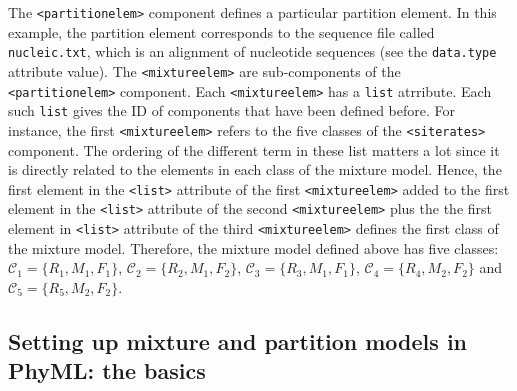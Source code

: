 \documentclass[a4paper,12pt]{article}
\newcommand{\x}[1]{\texttt{#1}}
\begin{document}
The  \x{<partitionelem>} component  defines a  particular partition  element. In  this example,  the
partition element corresponds to the sequence file  called \x{nucleic.txt}, which is an alignment of
nucleotide  sequences   (see  the   \x{data.type}  attribute   value).   The   \x{<mixtureelem>}  are
sub-components  of  the  \x{<partitionelem>}  component.   Each  \x{<mixtureelem>}  has  a  \x{list}
atrribute.   Each such  \x{list} gives  the ID  of components  that have  been defined  before.  For
instance,  the  first   \x{<mixtureelem>}  refers  to  the  five  classes   of  the  \x{<siterates>}
component. The  ordering of  the different term  in these list  matters a  lot since it  is directly
related  to the  elements in  each class  of  the mixture  model. Hence,  the first  element in  the
\x{<list>} attribute  of the first  \x{<mixtureelem>} added to the  first element in  the \x{<list>}
attribute of the second \x{<mixtureelem>} plus the  the first element in \x{<list>} attribute of the
third \x{<mixtureelem>} defines the  first class of the mixture model.  Therefore, the mixture model
defined   above   has   five   classes:  $\mathcal{C}_1   =   \{R_1,M_1,F_1\}$,   $\mathcal{C}_2   =
\{R_2,M_1,F_2\}$,  $\mathcal{C}_3   =  \{R_3,M_1,F_1\}$,   $\mathcal{C}_4  =   \{R_4,M_2,F_2\}$  and
$\mathcal{C}_5 = \{R_5,M_2,F_2\}$.




\subsection{Setting up mixture and partition models in PhyML: the basics}
\end{document}
